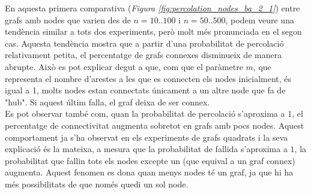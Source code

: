 \documentclass[a4paper]{article}
\begin{document}
	En aquesta primera comparativa (\textit{Figura \ref{fig:percolation_nodes_ba_2_1}}) entre grafs amb nodes que varien des de $n = 10..100$ i $n = 50..500$, podem veure una tendència similar a tots dos experiments, però molt més pronunciada en el segon cas. Aquesta tendència mostra que a partir d'una probabilitat de percolació relativament petita, el percentatge de grafs connexes disminueix de manera abrupte. Això es pot explicar degut a que, com que el paràmetre $m$, que representa el nombre d'arestes a les que es connecten els nodes inicialment, és igual a 1, molts nodes estan connectats únicament a un altre node que fa de "hub". Si aquest últim falla, el graf deixa de ser connex. \\
	
	Es pot observar també com, quan la probabilitat de percolació s'aproxima a $1$, el percentatge de connectivitat augmenta sobretot en grafs amb pocs nodes. Aquest comportament ja s'ha observat en els experiments de grafs quadrats i la seva explicació és la mateixa, a mesura que la probabilitat de fallida s'aproxima a $1$, la probabilitat que fallin tots els nodes excepte un (que equival a un graf connex) augmenta. Aquest fenomen es dona quan menys nodes té un graf, ja que hi ha més possibilitats de que només quedi un sol node. \\
	
\end{document}
